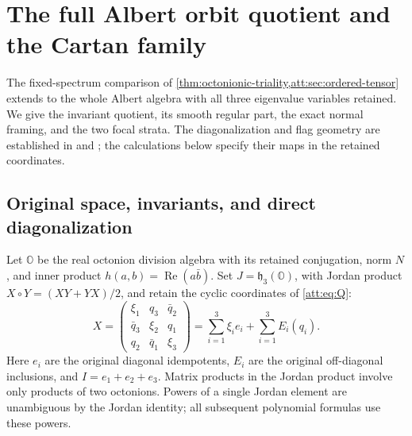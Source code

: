 \documentclass[11pt]{article}
\theoremstyle{definition}
\begin{document}
\section{The full Albert orbit quotient and the Cartan family}
\label{ocb:sec:full-family}

The fixed-spectrum comparison of
\cref{thm:octonionic-triality,att:sec:ordered-tensor} extends to the
whole Albert algebra with all three eigenvalue variables retained.
We give the invariant quotient, its smooth regular part, the exact
normal framing, and the two focal strata. The diagonalization and flag
geometry are established in \cite[Proposition~2.8.2 and
Theorems~2.7.4, 2.8.3]{Yokota2009} and
\cite[Definition~2.2 and Sections~2.3--2.6]{MareWillems2013}; the
calculations below specify their maps in the retained coordinates.

\subsection{Original space, invariants, and direct diagonalization}
\label{ocb:sec:diagonalization}

Let $\mathbb O$ be the real octonion division algebra with its retained
conjugation, norm $N$, and inner product
$h(a,b)=\operatorname{Re}(a\bar b)$. Set
$J=\mathfrak h_3(\mathbb O)$, with Jordan product
$X\circ Y=(XY+YX)/2$, and retain the cyclic coordinates of
\eqref{att:eq:Q}:
\begin{equation}
 X=\begin{pmatrix}\xi_1&q_3&\bar q_2\\
 \bar q_3&\xi_2&q_1\\q_2&\bar q_1&\xi_3\end{pmatrix}
 =\sum_{i=1}^3\xi_i e_i+\sum_{i=1}^3E_i(q_i).
 \label{ocb:eq:coordinates}\tag{OCB1}
\end{equation}
Here $e_i$ are the original diagonal idempotents, $E_i$ are the original
off-diagonal inclusions, and $I=e_1+e_2+e_3$. Matrix products in the
Jordan product involve only products of two octonions. Powers of a single
Jordan element are unambiguous by the Jordan identity; all subsequent
polynomial formulas use these powers.
\end{document}
